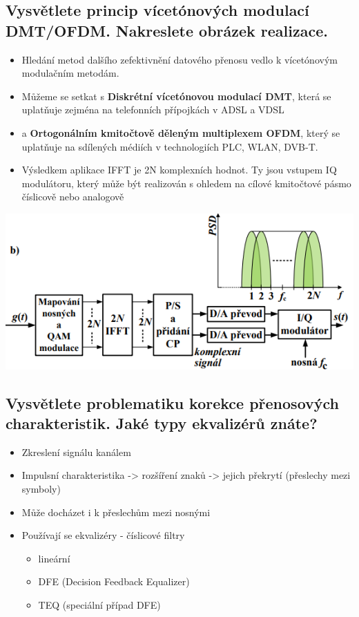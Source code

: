 \subsection{Vysvětlete princip vícetónových modulací DMT/OFDM. Nakreslete obrázek realizace.}
\begin{itemize}
    \item Hledání metod dalšího zefektivnění datového přenosu vedlo k vícetónovým modulačním metodám.
    \item Můžeme se setkat s \textbf{Diskrétní vícetónovou modulací DMT}, která se uplatňuje zejména na telefonních přípojkách v ADSL a VDSL  
    \item a \textbf{Ortogonálním kmitočtově děleným multiplexem OFDM}, který se uplatňuje na sdílených médiích v technologiích PLC, WLAN, DVB-T. 
    \item Výsledkem aplikace IFFT je 2N komplexních hodnot. Ty jsou vstupem IQ modulátoru, který může být realizován s ohledem na cílové kmitočtové pásmo číslicově nebo analogově
\end{itemize}
\includegraphics[]{images/image.png}
    
\subsection{Vysvětlete problematiku korekce přenosových charakteristik. Jaké typy ekvalizérů znáte?}
\begin{itemize}
    \item Zkreslení signálu kanálem
    \item Impulsní charakteristika -> rozšíření znaků -> jejich překrytí (přeslechy mezi symboly)
    \item Může docházet i k přeslechům mezi nosnými
    \item Používají  se ekvalizéry - číslicové filtry
    \begin{itemize}
        \item lineární
        \item DFE (Decision Feedback Equalizer)
        \item TEQ (speciální případ DFE)
    \end{itemize}
\end{itemize}

